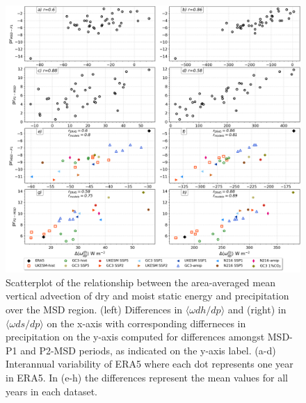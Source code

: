 
\begin{figure}[t!]
\includegraphics[width=\linewidth]{figures/thermo_scatter}
\caption[Scatterplot of the vertical advection of dry and moist static energy against precipitation]{Scatterplot of the relationship between the area-averaged mean vertical advection of dry and moist static energy and precipitation over the MSD region. (left) Differences in $\langle \omega dh/dp \rangle$  and (right) in $\langle \omega ds/dp \rangle$ on the x-axis with corresponding differneces in precipitation on the y-axis computed for differences amongst MSD-P1 and P2-MSD periods, as indicated on the y-axis label. (a-d) Interannual variability of ERA5 where each dot represents one year in ERA5.  In (e-h) the differences represent the mean values for all years in each dataset.    }
\label{fig:thermo_scatter}
\end{figure}

